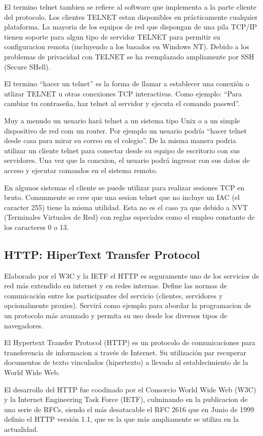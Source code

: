 \documentclass[a4paper,spanish,12pt]{book}
\begin{document}
El termino telnet tambien se refiere al software que implementa a la parte cliente del protocolo. Los clientes TELNET estan disponibles en prácticamente cualquier plataforma. La mayoria de los equipos de red que dispongan de una pila TCP/IP tienen soporte  para algun tipo de servidor TELNET para permitir su configuracion remota (incluyendo a los basados en Windows NT). Debido a los problemas de privacidad con TELNET se ha reemplazado ampliamente por SSH (Secure SHell).

El termino ``hacer un telnet'' es la forma de llamar a establecer una conexión o utlizar TELNET u otras conexiones TCP interactivas. Como ejemplo: ``Para cambiar tu contraseña, haz telnet al servidor y ejecuta el comando passwd''.

Muy a menudo un usuario hará telnet a un sistema tipo Unix o a un simple dispositivo de red com un router. Por ejemplo un usuario podría ``hacer telnet desde casa para mirar su correo en el colegio''. De la misma manera podria utilizar un cliente telnet para conectar desde su equipo de escritorio con sus servidores. Una vez que la conexion, el usuario podrá ingresar con sus datos de acceso y ejecutar comandos en el sistema remoto.

En algunos sistemas el cliente se puede utilizar para realizar sesiones TCP en bruto. Comunmente se cree que una sesion telnet que no incluye un IAC (el caracter 255) tiene la misma utilidad. Esta no es el caso ya que debido a NVT (Terminales Virtuales de Red) con reglas especiales como el empleo constante de los caracteres 0 o 13.

\subsection{HTTP: HiperText Transfer Protocol}
Elaborado por el W3C y la IETF el HTTP es seguramente uno de los servicios de red más extendido en internet y en redes internas. Define las normas de comunicación entre los participantes del servicio (clientes, servidores y opcionalmente proxies). Servirá como ejemplo para abordar la programacion de un protocolo m\'as avanzado y permita su uso desde los diversos tipos de navegadores.

El Hypertext Transfer Protocol (HTTP) es un protocolo de comunicaciones para transferencia de informacion a trav\'es de Internet. Su utilización par recuperar documentos de texto vinculados (hipertexto) a llevado al establecimiento de la World Wide Web.

El desarrollo del HTTP fue coodinado por el Consorcio World Wide Web (W3C) y la Internet Engineering Task Force (IETF), culminando en la publicacion de una serie de RFCs, siendo el más desatacable el RFC 2616 que en Junio de 1999 definio el HTTP versión 1.1, que es la que más ampliamente se utiliza en la actualidad.
\end{document}
